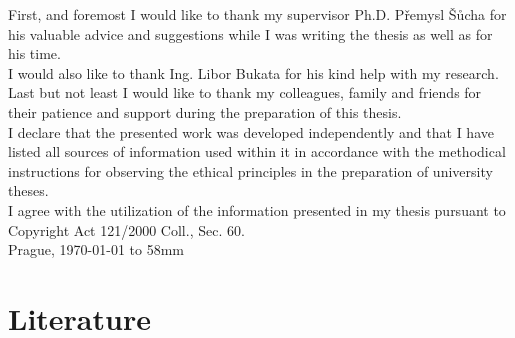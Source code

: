 \documentclass[11pt,twoside,a4paper,dvipsnames,svgnames]{book}
\author{Jan Dryk}
\begin{document}

\cleardoublepage

\maketitle
\cleardoublepage

{%
	First, and foremost I would like to thank my supervisor Ph.D. Přemysl Šůcha for his
    valuable advice and suggestions while I was writing the thesis as well as for his time.\\
    
    I would also like to thank Ing. Libor Bukata for his kind help with my research.\\
    
    Last but not least I would like to thank my colleagues, family and friends for their patience
    and support during the preparation of this thesis. \\
}
{%
    I declare that the presented work was developed independently and that I have listed
    all sources of information used within it in accordance with the methodical instructions for
    observing the ethical principles in the preparation of university theses. \\
    
    I agree with the utilization of the information presented in my thesis pursuant to
    Copyright Act 121/2000 Coll., Sec. 60. 
\\[90mm]
	Prague, \today \vspace{10mm} \hfill \hbox to 58mm{\tiny\dotfill}
}

\cleardoublepage


{
    
}
{
    
}

\setcounter{page}{1}

\tableofcontents











 


\section{Literature}

\printbibliography
\appendix





\end{document}
